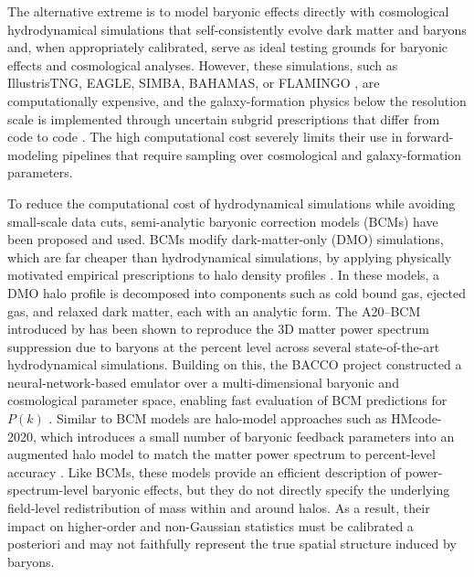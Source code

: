 \documentclass[linenumbers,trackchanges, twocolumn]{aastex701}
\begin{document}
The alternative extreme is to model baryonic effects directly with cosmological hydrodynamical simulations that self-consistently evolve dark matter and baryons and, when appropriately calibrated, serve as ideal testing grounds for baryonic effects and cosmological analyses. However, these simulations, such as IllustrisTNG, EAGLE, SIMBA, BAHAMAS, or FLAMINGO \citep[e.g.][]{Vogelsberger-2014,Schaye-2015,Pillepich-2018,Dave-2019,Schaye-2023}, are computationally expensive, and the galaxy-formation physics below the resolution scale is implemented through uncertain subgrid prescriptions that differ from code to code \citep{vanDaalen-2011,Vogelsberger-2020,VillaescusaNavarro-2021}. The high computational cost severely limits their use in forward-modeling pipelines that require sampling over cosmological and galaxy-formation parameters.

To reduce the computational cost of hydrodynamical simulations while avoiding small-scale data cuts, semi-analytic baryonic correction models (BCMs) have been proposed and used. BCMs modify dark-matter-only (DMO) simulations, which are far cheaper than hydrodynamical simulations, by applying physically motivated empirical prescriptions to halo density profiles \citep{Schneider-2015,Schneider-2019,Arico-2020}.
In these models, a DMO halo profile is decomposed into components such as cold bound gas, ejected gas, and relaxed dark matter, each with an analytic form. The A20--BCM introduced by \citet{Arico-2020} has been shown to reproduce the 3D matter power spectrum suppression due to baryons at the percent level across several state-of-the-art hydrodynamical simulations. Building on this, the BACCO project constructed a neural-network-based emulator over a multi-dimensional baryonic and cosmological parameter space, enabling fast evaluation of BCM predictions for $P(k)$ \citep{Arico-2021}. Similar to BCM models are halo-model approaches such as HMcode-2020, which introduces a small number of baryonic feedback parameters into an augmented halo model to match the matter power spectrum to percent-level accuracy \citep{Mead-2021}. Like BCMs, these models provide an efficient description of power-spectrum-level baryonic effects, but they do not directly specify the underlying field-level redistribution of mass within and around halos. As a result, their impact on higher-order and non-Gaussian statistics must be calibrated a posteriori and may not faithfully represent the true spatial structure induced by baryons.
\end{document}
